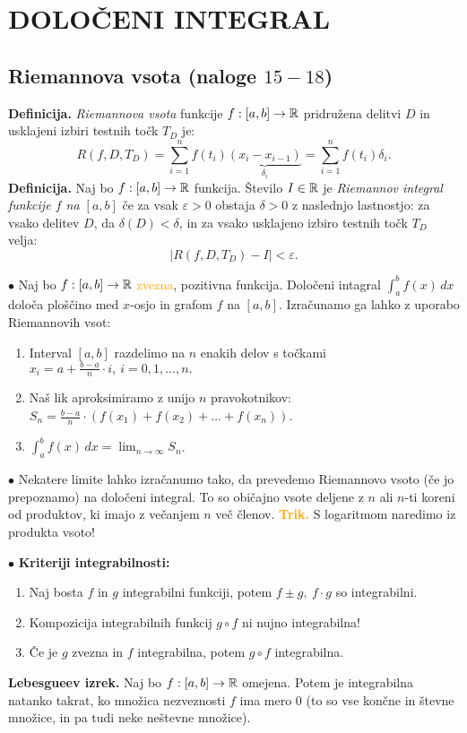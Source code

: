 \section{DOLOČENI INTEGRAL}
{\color{Purple} \subsection*{Riemannova vsota (naloge $15-18$)}}

\textbf{Definicija.} \emph{Riemannova vsota} funkcije $f: [a,b] \to \mathbb{R}$ pridružena delitvi $D$ in usklajeni izbiri testnih točk $T_D$ je: 
\[
    R(f, D, T_D) = \sum_{i=1}^{n}f(t_i)\underbrace{(x_i - x_{i-1})}_{\delta_i} = \sum_{i=1}^{n}f(t_i) \delta_i
.\]
%
\textbf{Definicija.} Naj bo $f: [a,b] \to \mathbb{R}$ funkcija. Število $I \in \mathbb{R}$ je \emph{Riemannov integral funkcije $f$ na $[a,b]$} če za vsak $\varepsilon > 0$ obstaja $\delta > 0$ z naslednjo lastnostjo: za vsako delitev $D$, da $\delta (D) < \delta$, in za vsako usklajeno izbiro testnih točk $T_D$ velja: \[
    \left| R(f, D, T_D) - I \right| < \varepsilon
.\]


$\bullet$ Naj bo $f: [a,b] \to \mathbb{R}$ \textcolor{orange}{zvezna}, pozitivna funkcija.
Določeni intagral $\displaystyle \int_{a}^{b} f(x) \, dx$ določa ploščino med $x$-osjo in grafom $f$ na $[a,b]$. Izračunamo ga lahko z uporabo Riemannovih vsot:
\begin{enumerate}
    \item Interval $[a,b]$ razdelimo na $n$ enakih delov s točkami \(\displaystyle x_i = a + \frac{b-a}{n} \cdot i, \ i = 0, 1, \ldots, n.\)
    \item Naš lik aproksimiramo z unijo $n$ pravokotnikov: $\displaystyle S_n = \frac{b-a}{n} \cdot \left(f(x_1) + f(x_2) + \ldots + f(x_n)\right)$.
    \item $\displaystyle \int_{a}^{b}f(x)  \,dx = \lim_{n \to \infty} S_n$.
\end{enumerate}
$\bullet$ Nekatere limite lahko izračanumo tako, da prevedemo Riemannovo vsoto (če jo prepoznamo) na določeni integral. To so običajno vsote deljene z $n$ ali $n$-ti koreni od produktov, ki imajo z večanjem $n$ več členov.
\textbf{\textcolor{Orange}{Trik.}} S logaritmom naredimo iz produkta vsoto!

$\bullet$ \textbf{Kriteriji integrabilnosti:}
\begin{enumerate}
    \item Naj bosta $f$ in $g$ integrabilni funkciji, potem $f \pm g, \ f \cdot g$ so integrabilni.
    \item Kompozicija integrabilnih funkcij $g \circ f$ ni nujno integrabilna!
    \item Če je $g$ zvezna in $f$ integrabilna, potem $g \circ f$ integrabilna.
\end{enumerate}
\textbf{Lebesgueev izrek.} Naj bo $f:[a,b] \to \mathbb{R}$ omejena. Potem je integrabilna natanko takrat, ko množica nezveznosti $f$ ima mero 0 (to so vse končne in števne množice, in pa tudi neke neštevne množice).

